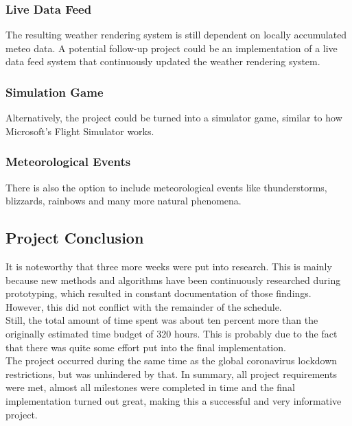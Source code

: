 \subsubsection{Live Data Feed}
The resulting weather rendering system is still dependent on locally accumulated meteo data. 
A potential follow-up project could be an implementation of a live data feed system that continuously updated the weather rendering system.

\subsubsection{Simulation Game}
Alternatively, the project could be turned into a simulator game, similar to how Microsoft's Flight Simulator works.

\subsubsection{Meteorological Events}
There is also the option to include meteorological events like thunderstorms, blizzards, rainbows and many more natural phenomena.

\subsection{Project Conclusion}
\label{section:project:conclusion}
It is noteworthy that three more weeks were put into research.
This is mainly because new methods and algorithms have been continuously researched during prototyping, which resulted in constant documentation of those findings.
However, this did not conflict with the remainder of the schedule.
\\
Still, the total amount of time spent was about ten percent more than the originally estimated time budget of 320 hours.
This is probably due to the fact that there was quite some effort put into the final implementation.
\\
The project occurred during the same time as the global coronavirus lockdown restrictions, but was unhindered by that.
\emptyline
In summary, all project requirements were met, almost all milestones were completed in time and the final implementation turned out great, making this a successful and very informative project.